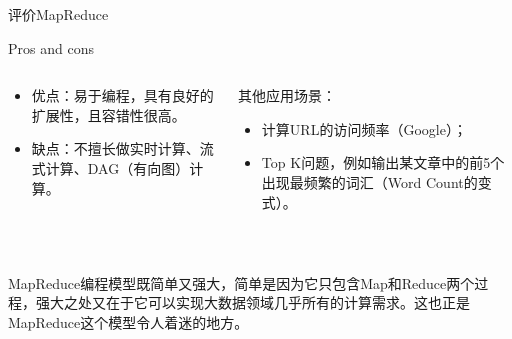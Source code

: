 \begin{frame}{\begin{CJK}{UTF8}{gkai}
			评价MapReduce
	\end{CJK}}
	
	\begin{block}{Pros and cons}
		\begin{columns}[c]
			\begin{column}{0.5\textwidth}
				\begin{itemize}
					\item \begin{CJK}{UTF8}{gkai}
						优点：易于编程，具有良好的扩展性，且容错性很高。
					\end{CJK}
				
					\item \begin{CJK}{UTF8}{gkai}
						缺点：不擅长做实时计算、流式计算、DAG（有向图）计算。
					\end{CJK}
				\end{itemize}
					
			\end{column}
			\vrule{}
			\begin{column}{0.5\textwidth}
				\begin{CJK}{UTF8}{gkai}
					其他应用场景：
				\end{CJK}
				\begin{itemize}
					\item \begin{CJK}{UTF8}{gkai}
						计算URL的访问频率（Google）；
					\end{CJK}
					
					
					
					\item \begin{CJK}{UTF8}{gkai}
						Top K问题，例如输出某文章中的前5个出现最频繁的词汇（Word  Count的变式）。
					\end{CJK}
				\end{itemize}
			
			\end{column}	
		\end{columns}
		
	\end{block}
	
	\cite[pp.~74--75]{Summary}\\
	\begin{CJK}{UTF8}{gkai}
	\alert{MapReduce编程模型既简单又强大}，简单是因为它只包含Map和Reduce两个过程，强大之处又在于它可以实现大数据领域几乎所有的计算需求。这也正是MapReduce这个模型令人着迷的地方。
\end{CJK}
	
\end{frame}

